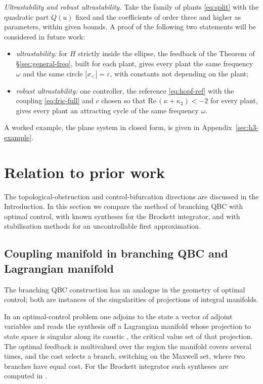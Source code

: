 \documentclass[11pt,reqno]{amsart}
\theoremstyle{plain}
\theoremstyle{definition}
\theoremstyle{remark}
\begin{document}
\emph{Ultrastability and robust ultrastability.} Take the family of plants \eqref{eq:split} with the quadratic part $Q(u)$ fixed and the coefficients of order three and higher as parameters, within given bounds. A proof of the following two statements will be considered in future work:
\begin{itemize}
\item \emph{ultrastability:} for $H$ strictly inside the ellipse, the feedback of the Theorem of \S\ref{sec:general-freq}, built for each plant, gives every plant the same frequency $\omega$ and the same circle $|x_<|=\varepsilon$, with constants not depending on the plant;
\item \emph{robust ultrastability:} one controller, the reference \eqref{eq:hopf-ref} with the coupling \eqref{eq:fric-full} and $c$ chosen so that $\mathrm{Re}\,(\kappa+\kappa_2)<-2$ for every plant, gives every plant an attracting cycle of the same frequency $\omega$.
\end{itemize}

A worked example, the plane system in closed form, is given in Appendix~\ref{sec:h3-example}.

\section{Relation to prior work}\label{sec:relation}
The topological-obstruction and control-bifurcation directions are discussed in the Introduction. In
this section we compare the method of branching QBC with optimal control, with known syntheses for the
Brockett integrator, and with stabilisation methods for an uncontrollable first approximation.

\subsection{Coupling manifold in branching QBC and Lagrangian manifold}\label{sec:bridge}
The branching QBC construction \cite{Shosh1990} has an analogue in the geometry of optimal control; both are
instances of the singularities of projections of integral manifolds.

In an
optimal-control problem one adjoins to the state a vector of adjoint variables and reads the
synthesis off a Lagrangian manifold whose projection to state space is singular along its
caustic \cite{AGV}, the critical value set of that projection. The optimal feedback is multivalued over the
region the manifold covers several times, and the cost selects a branch, switching on the Maxwell
set, where two branches have equal cost. For the Brockett integrator such syntheses are computed in
\cite{Zeng2019}.
\end{document}
